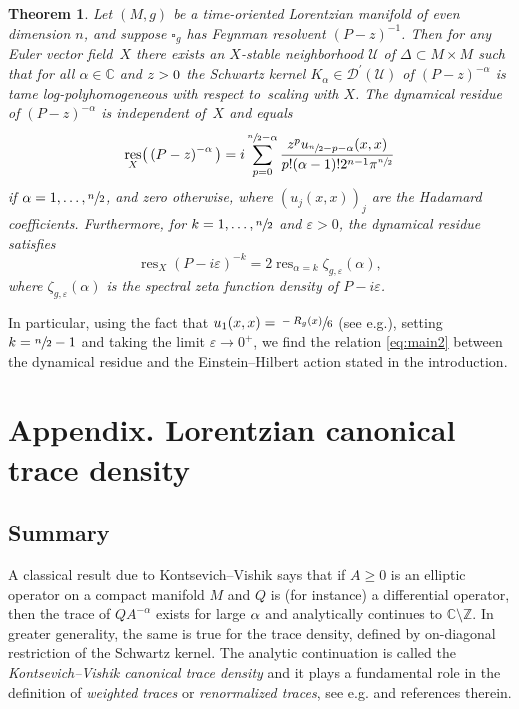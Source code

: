 \documentclass[10pt]{amsart}
\let\pazocal\mathscr
\newtheorem{theorem}{Theorem}[section]
\theoremstyle{definition}
\newcommand\zz{{\mathbb Z}}
\newcommand\cc{{\mathbb C}}
\let\cv\alpha
\let\euler X
\let\Im\relax
\let\Re\relax
\DeclareMathOperator{\Im}{Im}
\DeclareMathOperator{\Re}{Re}
\DeclareMathOperator{\resnorm}{res}
\DeclareMathOperator*{\res}{res}
\newcommand{\resdyn}{{\resnorm_\euler}}
\def\sn2{\sfrac{n}{2}}
\providecommand{\eg}{e.g.}\providecommand{\ie}{i.e.}\providecommand{\etc}{etc.}\providecommand{\resp}{resp.}\providecommand{\cf}{cf.}
\begin{document}
\begin{theorem}\label{thm:dynres1} Let $(M,g)$ be a time-oriented Lorentzian manifold of even dimension $n$, and suppose $\square_g$ has Feynman resolvent $(P-z)^{-1}$. Then for any Euler vector field~$\euler$ there exists an $\euler$-stable neighborhood $\pazocal{U}$ of $\Delta\subset M\times M$ such that for all $\cv\in\cc$ and $\Im z > 0$ the Schwartz kernel $K_\cv\in \pazocal{D}^\prime(\pazocal{U})$ of $(P-z)^{-\cv}$
is tame log-polyhomogeneous with respect to~scaling with $\euler$.
The dynamical residue of $(P-z)^{-\cv}$ is independent of~$\euler$ and equals
\begin{equation}\label{eq:explicit}
\resdyn\big(\left(P-z\right)^{-\cv} \big)= i\sum_{p=0}^{\sfrac{n}{2}-\cv}
\frac{z^pu_{\sfrac{n}{2}-p-\cv}(x,x)}{p!(\cv-1)!2^{n-1}\pi^{\sfrac{n}{2}}}
\end{equation}
if $\alpha = 1,\dots, \sn2$, and zero otherwise, where $(u_j(x,x))_j$ are the Hadamard coefficients. Furthermore, for $k=1,\dots,\sfrac{n}{2}$ and $\varepsilon>0$, the dynamical residue satisfies
\begin{equation*}%
\resdyn \left(P-i \varepsilon \right)^{-k} = 2 \res_{\cv =k}\zeta_{g,\varepsilon}(\cv),
\end{equation*}
where $\zeta_{g,\varepsilon}(\cv)$ is the spectral zeta function density of $P-i \varepsilon$.
\end{theorem}

In particular, using the fact that $u_1(x,x)=\sfrac{-R_g(x)}{6}$ (see \eg \cite[\S8.6]{Dang2020}), setting $k=\sfrac{n}{2}-1$ and taking the limit $\varepsilon\to 0^+$, we find the relation \eqref{eq:main2} between the dynamical residue and the Einstein--Hilbert action stated in the introduction.

\appendix
\section*{Appendix. Lorentzian canonical trace density}
\label{app}

\subsection{Summary} A classical result due to Kontsevich--Vishik \cite{Kontsevich1995} says that if $A\geqslant 0$ is an elliptic operator on a compact manifold $M$ and $Q$ is (for instance) a differential operator, then the trace of $Q A^{-\cv}$ exists for large $\Re \cv$ and analytically continues to $\cc\setminus \zz$. In greater generality, the same is true for the trace density, defined by on-diagonal restriction of the Schwartz kernel. The analytic continuation is called the \emph{Kontsevich--Vishik canonical trace density} and it plays a fundamental role in the definition of \emph{weighted traces} or \emph{renormalized traces}, see \eg \cite{paycha} and references therein.
\end{document}
